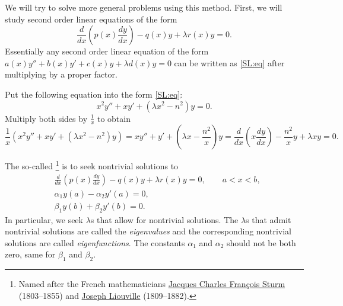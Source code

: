 \medskip

We will try to solve more general problems using this method.
First,
we will study 
second order linear equations of the form
\begin{equation} \label{SL:eq}
\frac{d}{dx} \left( p(x) \frac{dy}{dx} \right)
- q(x) y + \lambda r(x) y = 0 .
\end{equation}
Essentially
any second order linear equation
of the form $a(x) y'' + b(x) y' + c(x) y + \lambda d(x) y = 0$
can be written as \eqref{SL:eq}
after multiplying by a proper factor.

\begin{example}[Bessel]
Put the following equation into the form \eqref{SL:eq}:
\begin{equation*}
x^2 y'' + xy' + \left(\lambda x^2 - n^2\right)y = 0 .
\end{equation*}
Multiply both sides by $\frac{1}{x}$ to obtain
\begin{equation*}
\frac{1}{x} \left( x^2 y'' + xy' + \left(\lambda x^2 - n^2\right)y \right)
=
x y'' + y' + \left(\lambda x - \frac{n^2}{x}\right)y 
=
\frac{d}{dx} \left( x \frac{dy}{dx} \right)
- \frac{n^2}{x} y + \lambda x y  = 0.
\end{equation*}
\end{example}

The so-called 
\emph{}%
\footnote{Named after the French mathematicians
\href{https://en.wikipedia.org/wiki/Jacques_Charles_Fran\%C3\%A7ois_Sturm}{Jacques Charles Fran\c{c}ois Sturm}
(1803--1855) and
\href{https://en.wikipedia.org/wiki/Liouville}{Joseph Liouville}
(1809--1882).} is to seek
nontrivial solutions to
\begin{equation} \label{sl:slprob}
\boxed{~~
\begin{aligned}
&\frac{d}{dx} \left( p(x) \frac{dy}{dx} \right)
- q(x) y + \lambda r(x) y = 0, \qquad a < x < b, \\
&\alpha_1 y(a) - \alpha_2 y'(a) = 0, \\
&\beta_1 y(b) + \beta_2 y'(b) = 0.
\end{aligned}
~~}
\end{equation}
In particular, we seek $\lambda$s that allow for nontrivial solutions.
The $\lambda$s that admit nontrivial solutions
are called the \emph{eigenvalues}
and the corresponding
nontrivial solutions are called
\emph{eigenfunctions}.
The constants $\alpha_1$ and $\alpha_2$ should not be both zero, same for
$\beta_1$ and $\beta_2$.

